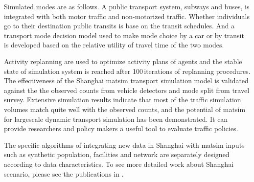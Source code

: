 Simulated modes are as follows. A public transport system, subways and buses, is integrated with both motor traffic and non-motorized traffic. Whether individuals go to their destination public transits is base on the transit schedules. And a transport mode decision model used to make mode choice by a car or by transit is developed based on the relative utility of travel time of the two modes.

Activity replanning are used to optimize activity plans of agents and the stable state of simulation system is reached after 100\,iterations of replanning procedures. The effectiveness of the Shanghai \gls{matsim} transport simulation model is validated against the the observed counts from vehicle detectors and mode split from travel survey. Extensive simulation results indicate that most of the traffic simulation volumes match quite well with the observed counts, and the potential of \gls{matsim} for \gls{largescale} dynamic transport simulation has been demonstrated. It can provide researchers and policy makers a useful tool to evaluate traffic policies. 

The specific algorithms of integrating new data in Shanghai with \gls{matsim} inputs such as synthetic population, facilities and network are separately designed according to data characteristics. To see more detailed work about Shanghai scenario, please see the publications in \citet[][]{ZhangLEtAl_TRR_2014}.

